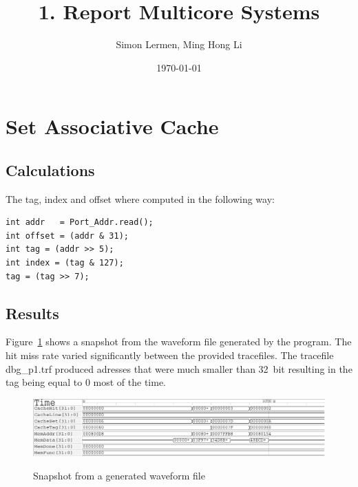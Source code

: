 \documentclass[11pt]{scrartcl}
\title{1. Report Multicore Systems}
\author{Simon Lermen, Ming Hong Li}
\date{\today}
\begin{document}
\maketitle
\section{Set Associative Cache}

\subsection{Calculations}

The tag, index and offset where computed in the following way:
\begin{lstlisting}
int addr   = Port_Addr.read();
int offset = (addr & 31);
int tag = (addr >> 5);
int index = (tag & 127);     
tag = (tag >> 7); 
\end{lstlisting}

\subsection{Results}

Figure~\ref{fig:waveform} shows a snapshot from the waveform file generated by the program.
The hit miss rate varied significantly between the provided tracefiles. The tracefile dbg\_p1.trf produced adresses that were much smaller than 32~bit resulting in the tag being equal to 0 most of the time.

\begin{figure}
\centering
\includegraphics[scale=0.7]{./graphics/wavefilecut.pdf}
\label{fig:waveform}
\caption{Snapshot from a generated waveform file}
\end{figure}
\end{document}
